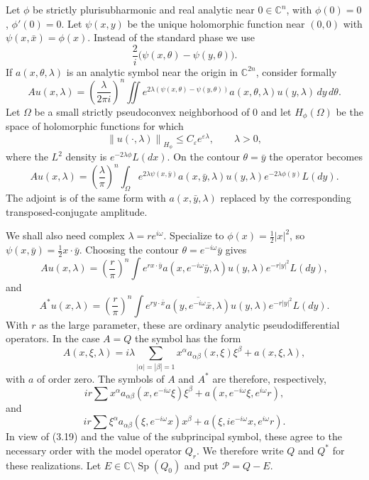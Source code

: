 \documentclass[11pt,a4paper]{article}
\newcommand{\C}{\mathbb C}
\newcommand{\Sp}{\operatorname{Sp}}
\newcommand{\eps}{\varepsilon}
\newcommand{\norm}[1]{\left\lVert #1\right\rVert}
\numberwithin{equation}{section}
\theoremstyle{remark}
\begin{document}
Let $\phi$ be strictly plurisubharmonic and real analytic near $0\in\C^n$, with $\phi(0)=0$, $\phi'(0)=0$. Let $\psi(x,y)$ be the unique holomorphic function near $(0,0)$ with $\psi(x,\bar x)=\phi(x)$. Instead of the standard phase we use
\[
\frac2i\bigl(\psi(x,\theta)-\psi(y,\theta)\bigr).
\]
If $a(x,\theta,\lambda)$ is an analytic symbol near the origin in $\C^{2n}$, consider formally
\begin{equation}
Au(x,\lambda)=\left(\frac{\lambda}{2\pi i}\right)^n
\iint e^{2\lambda(\psi(x,\theta)-\psi(y,\theta))}
 a(x,\theta,\lambda)u(y,\lambda)\,dy\,d\theta.
\end{equation}
Let $\Omega$ be a small strictly pseudoconvex neighborhood of $0$ and let $H_\phi(\Omega)$ be the space of holomorphic functions for which
\[
\norm{u(\cdot,\lambda)}_{H_\phi}\le C_\eps e^{\eps\lambda},\qquad\lambda>0,
\]
where the $L^2$ density is $e^{-2\lambda\phi}L(dx)$. On the contour $\theta=\bar y$ the operator becomes
\begin{equation}
Au(x,\lambda)=\left(\frac\lambda\pi\right)^n
\int_\Omega e^{2\lambda\psi(x,\bar y)}a(x,\bar y,\lambda)
 u(y,\lambda)e^{-2\lambda\phi(y)}L(dy).
\end{equation}
The adjoint is of the same form with $a(x,\bar y,\lambda)$ replaced by the corresponding transposed-conjugate amplitude.

We shall also need complex $\lambda=re^{i\omega}$. Specialize to $\phi(x)=\frac12|x|^2$, so $\psi(x,\bar y)=\frac12x\cdot\bar y$. Choosing the contour $\theta=e^{-i\omega}\bar y$ gives
\begin{equation}
Au(x,\lambda)=\left(\frac r\pi\right)^n
\int e^{r x\cdot\bar y}a(x,e^{-i\omega}\bar y,\lambda)
 u(y,\lambda)e^{-r|y|^2}L(dy),
\end{equation}
and
\begin{equation}
A^*u(x,\lambda)=\left(\frac r\pi\right)^n
\int e^{r y\cdot\bar x}\overline{a(y,e^{-i\omega}\bar x,\lambda)}
 u(y,\lambda)e^{-r|y|^2}L(dy).
\end{equation}
With $r$ as the large parameter, these are ordinary analytic pseudodifferential operators. In the case $A=Q$ the symbol has the form
\begin{equation}
A(x,\xi,\lambda)=i\lambda\sum_{|\alpha|=|\beta|=1}
x^\alpha a_{\alpha\beta}(x,\xi)\xi^\beta+a(x,\xi,\lambda),
\end{equation}
with $a$ of order zero. The symbols of $A$ and $A^*$ are therefore, respectively,
\begin{equation}
ir\sum x^\alpha a_{\alpha\beta}(x,e^{-i\omega}\xi)\xi^\beta
+a(x,e^{-i\omega}\xi,e^{i\omega}r),
\end{equation}
and
\begin{equation}
ir\sum \xi^\alpha a_{\alpha\beta}(\xi,e^{-i\omega}x)x^\beta
+a(\xi,ie^{-i\omega}x,e^{i\omega}r).
\end{equation}
In view of (3.19) and the value of the subprincipal symbol, these agree to the necessary order with the model operator $Q_r$. We therefore write $Q$ and $Q^*$ for these realizations. Let $E\in\C\setminus\Sp(Q_0)$ and put $\mathcal P=Q-E$.
\end{document}
